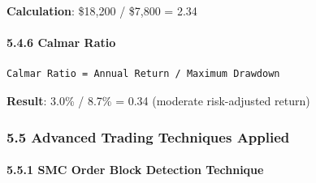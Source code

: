 \textbf{Calculation}: \$18,200 / \$7,800 = 2.34

\paragraph{5.4.6 Calmar Ratio}\label{calmar-ratio}

\begin{verbatim}
Calmar Ratio = Annual Return / Maximum Drawdown
\end{verbatim}

\textbf{Result}: 3.0\% / 8.7\% = 0.34 (moderate risk-adjusted return)

\subsubsection{5.5 Advanced Trading Techniques
Applied}\label{advanced-trading-techniques-applied}

\paragraph{5.5.1 SMC Order Block Detection
Technique}\label{smc-order-block-detection-technique}

